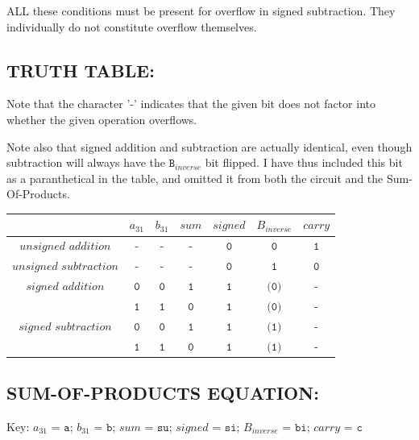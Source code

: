 \documentclass[a4paper]{article}
\begin{document}
ALL these conditions must be present for overflow in signed subtraction. They individually do not constitute overflow themselves.

\subsection*{TRUTH TABLE:}
Note that the character '-' indicates that the given bit does not factor into whether the given operation overflows.

Note also that signed addition and subtraction are actually identical, even though subtraction will always have the $\texttt{B}_{inverse}$ bit flipped. I have thus included this bit as a paranthetical in the table, and omitted it from both the circuit and the Sum-Of-Products.
\begin{center}
\begin{tabular}{|c|c|c|c|c|c|c|}
\hline
& $\textit{a}_{31}$ & $\textit{b}_{31}$ & $\textit{sum}$ & $\textit{signed}$ & $\textit{B}_{inverse}$ & $\textit{carry}$ \\
\hline
\hline
$\textit{unsigned addition}$ & $\texttt{-}$ & $\texttt{-}$ & $\texttt{-}$ & $\texttt{0}$ & $\texttt{0}$ & $\texttt{1}$ \\
\hline
\hline
$\textit{unsigned subtraction}$ & $\texttt{-}$ & $\texttt{-}$ & $\texttt{-}$ & $\texttt{0}$ & $\texttt{1}$ & $\texttt{0}$ \\
\hline
\hline
$\textit{signed addition}$ & $\texttt{0}$ & $\texttt{0}$ & $\texttt{1}$ & $\texttt{1}$ & $\texttt{(0)}$ & $\texttt{-}$ \\
\hline
 & $\texttt{1}$ & $\texttt{1}$ & $\texttt{0}$ & $\texttt{1}$ & $\texttt{(0)}$ & $\texttt{-}$ \\
\hline
\hline
$\textit{signed subtraction}$ & $\texttt{0}$ & $\texttt{0}$ & $\texttt{1}$ & $\texttt{1}$ & $\texttt{(1)}$ & $\texttt{-}$ \\
\hline
 & $\texttt{1}$ & $\texttt{1}$ & $\texttt{0}$ & $\texttt{1}$ & $\texttt{(1)}$ & $\texttt{-}$ \\
\hline
\end{tabular}
\end{center}

\subsection*{SUM-OF-PRODUCTS EQUATION:}

Key:  $\textit{a}_{31}$ = $\texttt{a}$; $\textit{b}_{31}$ = $\texttt{b}$; $\textit{sum}$ = $\texttt{su}$; $\textit{signed}$ = $\texttt{si}$; $\textit{B}_{inverse}$ = $\texttt{bi}$; $\textit{carry}$ = $\texttt{c}$
\end{document}
